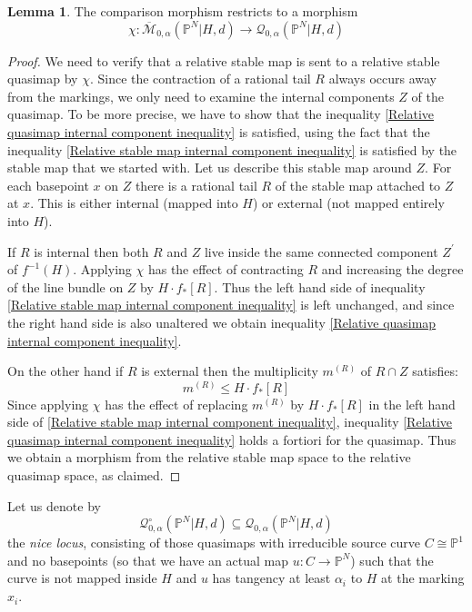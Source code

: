 \documentclass[11pt]{amsart}
\newcommand{\M}[4]{\overline{\mathcal{M}}_{#1,#2}(#3,#4)}
\newcommand{\Q}[4]{\mathcal{Q}_{#1,#2}(#3,#4)}
\newcommand{\PP}{\mathbb P}
\renewcommand{\to}{\rightarrow}
\theoremstyle{definition}
\newtheorem{lem}[thm]{Lemma}
\theoremstyle{definition}
\newcommand{\ilemph}[1]{\emph{#1}}
\begin{document}
\begin{lem}\label{lem:comparison}
The comparison morphism restricts to a morphism 
\begin{equation*} \chi: \M{0}{\alpha}{\PP^N|H}{d}\to \Q{0}{\alpha}{\PP^N|H}{d} \end{equation*}
\end{lem}
\begin{proof}
We need to verify that a relative stable map is sent to a relative stable quasimap by $\chi$. Since the contraction of a rational tail $R$ always occurs away from the markings, we only need to examine the internal components $Z$ of the quasimap. To be more precise, we have to show that the inequality \eqref{Relative quasimap internal component inequality} is satisfied, using the fact that the inequality \eqref{Relative stable map internal component inequality} is satisfied by the stable map that we started with.  Let us describe this stable map around $Z$. For each basepoint $x$ on $Z$ there is a rational tail $R$ of the stable map attached to $Z$ at $x$. This is either internal (mapped into $H$) or external (not mapped entirely into $H$).  

If $R$ is internal then both $R$ and $Z$ live inside the same connected component $Z^\prime$ of $f^{-1}(H)$. Applying $\chi$ has the effect of contracting $R$ and increasing the degree of the line bundle on $Z$ by $H \cdot f_* [R]$. Thus the left hand side of inequality \eqref{Relative stable map internal component inequality} is left unchanged, and since the right hand side is also unaltered we obtain inequality \eqref{Relative quasimap internal component inequality}.

On the other hand if $R$ is external then the multiplicity $m^{(R)}$ of $R \cap Z$ satisfies:
\begin{equation*} m^{(R)} \leq H \cdot f_* [R] \end{equation*}
Since applying $\chi$ has the effect of replacing $m^{(R)}$ by $H \cdot f_* [R]$ in the left hand side of \eqref{Relative stable map internal component inequality}, inequality \eqref{Relative quasimap internal component inequality} holds a fortiori for the quasimap. Thus we obtain a morphism from the relative stable map space to the relative quasimap space, as claimed.
\end{proof}
Let us denote by
\begin{equation*} \mathcal Q^{\circ}_{0,\alpha}(\PP^N|H,d) \subseteq \Q{0}{\alpha}{\PP^N|H}{d} \end{equation*}
the \ilemph{nice locus}, consisting of those quasimaps with irreducible source curve $C \cong \PP^1$ and no basepoints (so that we have an actual map $u : C \to \PP^N$) such that the curve is not mapped inside $H$ and $u$ has tangency at least $\alpha_i$ to $H$ at the marking $x_i$.
\end{document}
